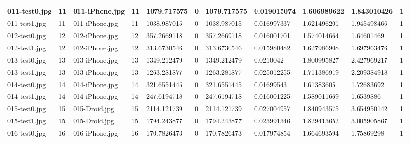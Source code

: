 \begin{landscape}
\begin{longtable}{|p{2cm}|p{1cm}|p{2cm}|p{1cm}|p{2cm}|p{1cm}|p{2cm}|p{2cm}|p{2cm}|p{2cm}|p{1cm}|}
	\hline
	011-test0.jpg & 11       & 011-iPhone.jpg & 11                   & 1079.717575   & 0                & 1079.717575         & 0.019015074   & 1.606989622   & 1.843010426       & 1         \\ 
	\hline
	011-test1.jpg & 11       & 011-iPhone.jpg & 11                   & 1038.987015   & 0                & 1038.987015         & 0.016997337   & 1.621496201   & 1.945498466       & 1         \\ 
	\hline
	012-test0.jpg & 12       & 012-iPhone.jpg & 12                   & 357.2669118   & 0                & 357.2669118         & 0.016001701   & 1.574014664   & 1.64601469        & 1         \\ 
	\hline
	012-test1.jpg & 12       & 012-iPhone.jpg & 12                   & 313.6730546   & 0                & 313.6730546         & 0.015980482   & 1.627986908   & 1.697963476       & 1         \\ 
	\hline
	013-test0.jpg & 13       & 013-iPhone.jpg & 13                   & 1349.212479   & 0                & 1349.212479         & 0.0210042     & 1.800995827   & 2.427969217       & 1         \\ 
	\hline
	013-test1.jpg & 13       & 013-iPhone.jpg & 13                   & 1263.281877   & 0                & 1263.281877         & 0.025012255   & 1.711386919   & 2.209384918       & 1         \\ 
	\hline
	014-test0.jpg & 14       & 014-iPhone.jpg & 14                   & 321.6551445   & 0                & 321.6551445         & 0.01699543    & 1.61383605    & 1.72683692        & 1         \\ 
	\hline
	014-test1.jpg & 14       & 014-iPhone.jpg & 14                   & 247.6194718   & 0                & 247.6194718         & 0.016001225   & 1.589011669   & 1.6539886         & 1         \\ 
	\hline
	015-test0.jpg & 15       & 015-Droid.jpg  & 15                   & 2114.121739   & 0                & 2114.121739         & 0.027004957   & 1.840943575   & 3.654950142       & 1         \\ 
	\hline
	015-test1.jpg & 15       & 015-Droid.jpg  & 15                   & 1794.243877   & 0                & 1794.243877         & 0.023991346   & 1.829413652   & 3.005905867       & 1         \\ 
	\hline
	016-test0.jpg & 16       & 016-iPhone.jpg & 16                   & 170.7826473   & 0                & 170.7826473         & 0.017974854   & 1.664693594   & 1.75869298        & 1         \\ 

\end{longtable}
\end{landscape}
